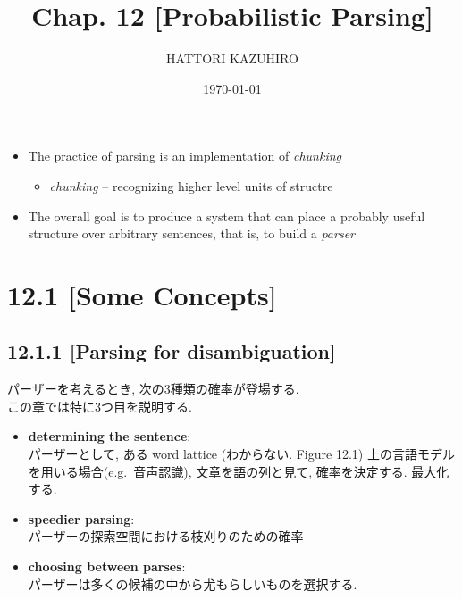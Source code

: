 \documentclass{beamer}
\title{Chap. 12 {[}Probabilistic Parsing{]}}
\author[]{HATTORI KAZUHIRO}
\institute[CS]{Univ. of Tokyo, CS}
\date{\today}
\begin{document}
\begin{frame}
  \titlepage
\end{frame}

\begin{frame}

  \begin{itemize}
    \itemsep1pt\parskip0pt
    \item
      The practice of parsing is an implementation of \emph{chunking}

      \begin{itemize}
        \itemsep1pt\parskip0pt
        \item
          \emph{chunking} -- recognizing higher level units of structre
      \end{itemize}
    \item
      The overall goal is to produce a system that can place a probably
      useful structure over arbitrary sentences, that is, to build a
      \emph{parser}
  \end{itemize}

\end{frame}

\section{12.1 {[}Some Concepts{]}}

\subsection{12.1.1 {[}Parsing for disambiguation{]}}

\begin{frame}
パーザーを考えるとき, 次の3種類の確率が登場する. \\この章では特に3つ目を説明する. 

\begin{itemize}
\itemsep1pt\parskip0pt
\item
  \textbf{determining the sentence}:\\ パーザーとして, ある word lattice
  (わからない. Figure 12.1) 上の言語モデルを用いる場合(e.g.~音声認識), 
  文章を語の列と見て, 確率を決定する. 最大化する. 
\item
  \textbf{speedier parsing}:\\
  パーザーの探索空間における枝刈りのための確率
\item
  \textbf{choosing between parses}:\\
  パーザーは多くの候補の中から尤もらしいものを選択する. 
\end{itemize}
\end{frame}
\end{document}
